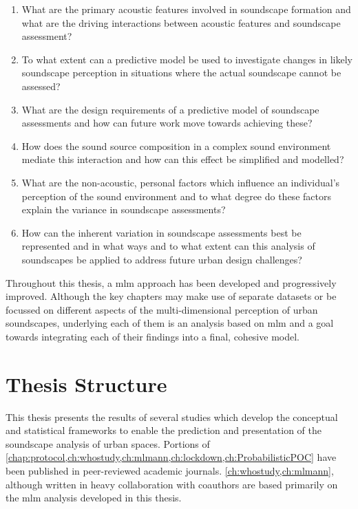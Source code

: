 \begin{enumerate}
  \item What are the primary acoustic features involved in soundscape formation and what are the driving interactions between acoustic features and soundscape assessment?
  \item To what extent can a predictive model be used to investigate changes in likely soundscape perception in situations where the actual soundscape cannot be assessed?
  \item What are the design requirements of a predictive model of soundscape assessments and how can future work move towards achieving these?
  \item How does the sound source composition in a complex sound environment mediate this interaction and how can this effect be simplified and modelled? 
  \item What are the non-acoustic, personal factors which influence an individual's perception of the sound environment and to what degree do these factors explain the variance in soundscape assessments? 
  \item How can the inherent variation in soundscape assessments best be represented and in what ways and to what extent can this analysis of soundscapes be applied to address future urban design challenges? 
\end{enumerate}

Throughout this thesis, a \gls{mlm} approach has been developed and progressively improved. Although the key chapters may make use of separate datasets or be focussed on different aspects of the multi-dimensional perception of urban soundscapes, underlying each of them is an analysis based on \gls{mlm} and a goal towards integrating each of their findings into a final, cohesive model.


\section{Thesis Structure}

This thesis presents the results of several studies which develop the conceptual and statistical frameworks to enable the prediction and presentation of the soundscape analysis of urban spaces. Portions of \cref{chap:protocol,ch:whostudy,ch:mlmann,ch:lockdown,ch:ProbabilisticPOC} have been published in peer-reviewed academic journals. \cref{ch:whostudy,ch:mlmann}, although written in heavy collaboration with coauthors are based primarily on the \gls{mlm} analysis developed in this thesis.

